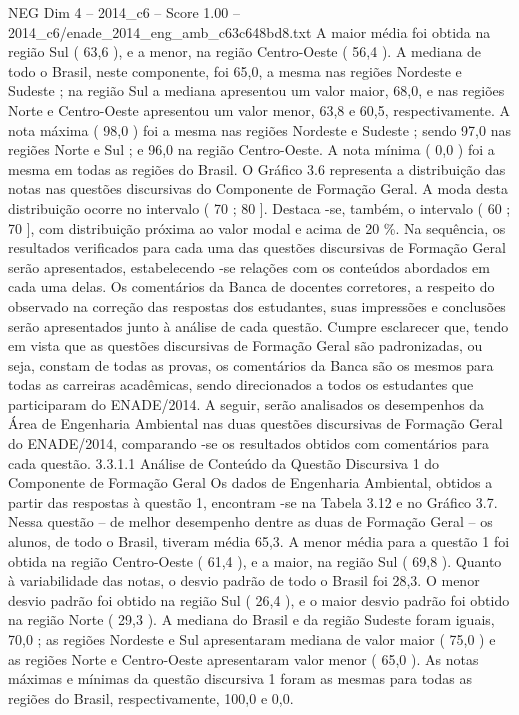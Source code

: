 \begin{textsample}{NEG Dim 4 – 2014\_c6 – Score 1.00 – 2014\_c6/enade\_2014\_eng\_amb\_c63c648bd8.txt}
A maior média foi obtida na região Sul ( 63,6 ), e a menor, na região Centro-Oeste ( 56,4 ).
A mediana de todo o Brasil, neste componente, foi 65,0, a mesma nas regiões Nordeste e Sudeste ; na região Sul a mediana apresentou um valor maior, 68,0, e nas regiões Norte e Centro-Oeste apresentou um valor menor, 63,8 e 60,5, respectivamente.
A nota máxima ( 98,0 ) foi a mesma nas regiões Nordeste e Sudeste ; sendo 97,0 nas regiões Norte e Sul ; e 96,0 na região Centro-Oeste.
A nota mínima ( 0,0 ) foi a mesma em todas as regiões do Brasil.
O Gráfico 3.6 representa a distribuição das notas nas questões discursivas do Componente de Formação Geral.
A moda desta distribuição ocorre no intervalo ( 70 ; 80 ].
Destaca -se, também, o intervalo ( 60 ; 70 ], com distribuição próxima ao valor modal e acima de 20 \%.
Na sequência, os resultados verificados para cada uma das questões discursivas de Formação Geral serão apresentados, estabelecendo -se relações com os conteúdos abordados em cada uma delas.
Os comentários da Banca de docentes corretores, a respeito do observado na correção das respostas dos estudantes, suas impressões e conclusões serão apresentados junto à análise de cada questão.
Cumpre esclarecer que, tendo em vista que as questões discursivas de Formação Geral são padronizadas, ou seja, constam de todas as provas, os comentários da Banca são os mesmos para todas as carreiras acadêmicas, sendo direcionados a todos os estudantes que participaram do ENADE/2014.
A seguir, serão analisados os desempenhos da Área de Engenharia Ambiental nas duas questões discursivas de Formação Geral do ENADE/2014, comparando -se os resultados obtidos com comentários para cada questão. 3.3.1.1 Análise de Conteúdo da Questão Discursiva 1 do Componente de Formação Geral Os dados de Engenharia Ambiental, obtidos a partir das respostas à questão 1, encontram -se na Tabela 3.12 e no Gráfico 3.7.
Nessa questão – de melhor desempenho dentre as duas de Formação Geral – os alunos, de todo o Brasil, tiveram média 65,3.
A menor média para a questão 1 foi obtida na região Centro-Oeste ( 61,4 ), e a maior, na região Sul ( 69,8 ).
Quanto à variabilidade das notas, o desvio padrão de todo o Brasil foi 28,3.
O menor desvio padrão foi obtido na região Sul ( 26,4 ), e o maior desvio padrão foi obtido na região Norte ( 29,3 ).
A mediana do Brasil e da região Sudeste foram iguais, 70,0 ; as regiões Nordeste e Sul apresentaram mediana de valor maior ( 75,0 ) e as regiões Norte e Centro-Oeste apresentaram valor menor ( 65,0 ).
As notas máximas e mínimas da questão discursiva 1 foram as mesmas para todas as regiões do Brasil, respectivamente, 100,0 e 0,0.

\end{textsample}
